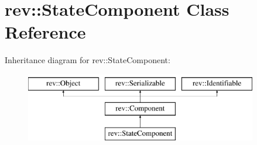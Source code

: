 \hypertarget{classrev_1_1_state_component}{}\section{rev\+::State\+Component Class Reference}
\label{classrev_1_1_state_component}
Inheritance diagram for rev\+::State\+Component\+:\begin{figure}[H]
\begin{center}
\leavevmode
\includegraphics[height=3.000000cm]{classrev_1_1_state_component}
\end{center}
\end{figure}
